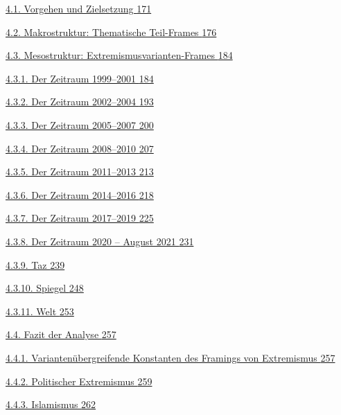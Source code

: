 \hyperref[vorgehen-und-zielsetzung]{4.1. Vorgehen und Zielsetzung \hyperref[vorgehen-und-zielsetzung]{171}}

\hyperref[makrostruktur-thematische-teil-frames]{4.2. Makrostruktur: Thematische Teil-Frames \hyperref[makrostruktur-thematische-teil-frames]{176}}

\hyperref[mesostruktur-extremismusvarianten-frames]{4.3. Mesostruktur: Extremismusvarianten-Frames \hyperref[mesostruktur-extremismusvarianten-frames]{184}}

\hyperref[der-zeitraum-1999-2001]{4.3.1. Der Zeitraum 1999--2001 \hyperref[der-zeitraum-1999-2001]{184}}

\hyperref[der-zeitraum-2002-2004]{4.3.2. Der Zeitraum 2002--2004 \hyperref[der-zeitraum-2002-2004]{193}}

\hyperref[der-zeitraum-2005-2007]{4.3.3. Der Zeitraum 2005--2007 \hyperref[der-zeitraum-2005-2007]{200}}

\hyperref[der-zeitraum-2008-2010]{4.3.4. Der Zeitraum 2008--2010 \hyperref[der-zeitraum-2008-2010]{207}}

\hyperref[der-zeitraum-2011-2013]{4.3.5. Der Zeitraum 2011--2013 \hyperref[der-zeitraum-2011-2013]{213}}

\hyperref[der-zeitraum-2014-2016]{4.3.6. Der Zeitraum 2014--2016 \hyperref[der-zeitraum-2014-2016]{218}}

\hyperref[der-zeitraum-2017-2019]{4.3.7. Der Zeitraum 2017--2019 \hyperref[der-zeitraum-2017-2019]{225}}

\hyperref[der-zeitraum-2020-august-2021]{4.3.8. Der Zeitraum 2020 -- August 2021 \hyperref[der-zeitraum-2020-august-2021]{231}}

\hyperref[taz]{4.3.9. Taz \hyperref[taz]{239}}

\hyperref[spiegel]{4.3.10. Spiegel \hyperref[spiegel]{248}}

\hyperref[welt]{4.3.11. Welt \hyperref[welt]{253}}

\hyperref[fazit-der-analyse]{4.4. Fazit der Analyse \hyperref[fazit-der-analyse]{257}}

\hyperref[variantenuxfcbergreifende-konstanten-des-framings-von-extremismus]{4.4.1. Variantenübergreifende Konstanten des Framings von Extremismus \hyperref[variantenuxfcbergreifende-konstanten-des-framings-von-extremismus]{257}}

\hyperref[politischer-extremismus]{4.4.2. Politischer Extremismus \hyperref[politischer-extremismus]{259}}

\hyperref[islamismus-11]{4.4.3. Islamismus \hyperref[islamismus-11]{262}}

